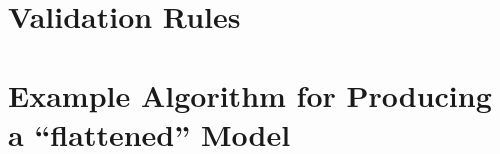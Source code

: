 \section{Validation Rules}
\label{validation}











\section{Example Algorithm for Producing a ``flattened'' Model}
\label{flatten}